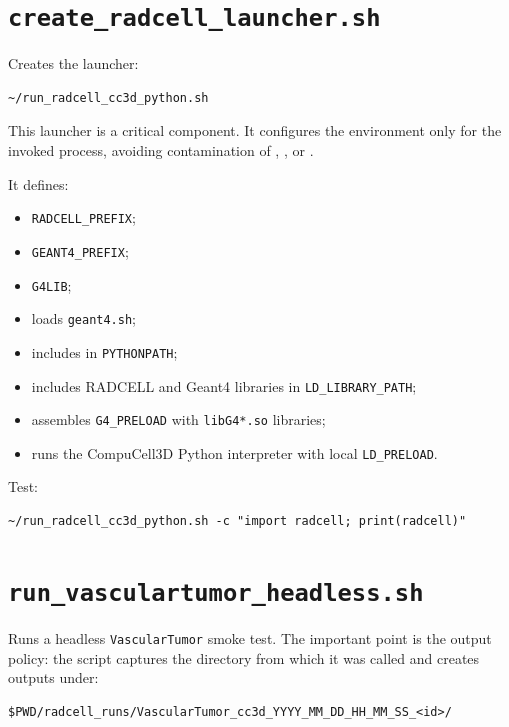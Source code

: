 \documentclass[11pt,a4paper,twoside,pdftex]{refrep}
\begin{document}
\section{\texttt{create\_radcell\_launcher.sh}}

Creates the launcher:

\begin{lstlisting}
~/run_radcell_cc3d_python.sh
\end{lstlisting}

This launcher is a critical component. It configures the environment only for the invoked process, avoiding contamination of , , or .

It defines:

\begin{itemize}
  \item \texttt{RADCELL\_PREFIX};
  \item \texttt{GEANT4\_PREFIX};
  \item \texttt{G4LIB};
  \item loads \texttt{geant4.sh};
  \item includes  in \texttt{PYTHONPATH};
  \item includes RADCELL and Geant4 libraries in \texttt{LD\_LIBRARY\_PATH};
  \item assembles \texttt{G4\_PRELOAD} with \texttt{libG4*.so} libraries;
  \item runs the CompuCell3D Python interpreter with local \texttt{LD\_PRELOAD}.
\end{itemize}

Test:

\begin{lstlisting}
~/run_radcell_cc3d_python.sh -c "import radcell; print(radcell)"
\end{lstlisting}

\section{\texttt{run\_vasculartumor\_headless.sh}}

Runs a headless \texttt{VascularTumor} smoke test. The important point is the output policy: the script captures the directory from which it was called and creates outputs under:

\begin{lstlisting}
$PWD/radcell_runs/VascularTumor_cc3d_YYYY_MM_DD_HH_MM_SS_<id>/
\end{lstlisting}
\end{document}
